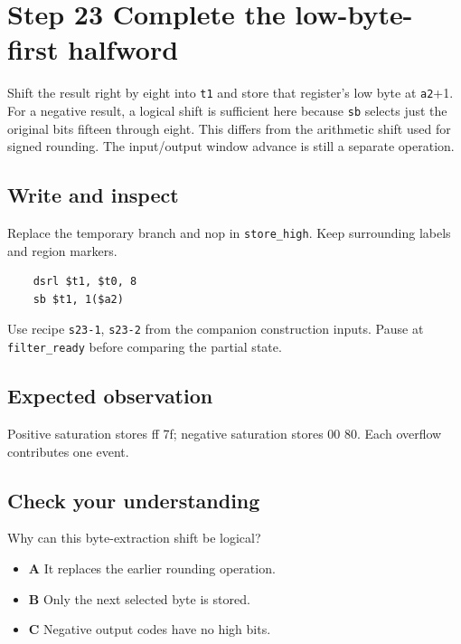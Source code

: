 \section{Step 23 Complete the low-byte-first halfword}\label{fir-s23}

Shift the result right by eight into \texttt{t1} and store that register’s low byte at \texttt{a2}+1. For a negative result, a logical shift is sufficient here because \texttt{sb} selects just the original bits fifteen through eight. This differs from the arithmetic shift used for signed rounding. The input/output window advance is still a separate operation.

\subsection{Write and inspect}
Replace the temporary branch and nop in \texttt{store\_high}. Keep surrounding labels and region markers.

\begin{verbatim}
    dsrl $t1, $t0, 8
    sb $t1, 1($a2)
\end{verbatim}
Use recipe \texttt{s23-1}, \texttt{s23-2} from the companion construction inputs. Pause at \texttt{filter\_ready} before comparing the partial state.

\subsection{Expected observation}
Positive saturation stores ff 7f; negative saturation stores 00 80. Each overflow contributes one event.

\subsection{Check your understanding}
Why can this byte-extraction shift be logical?

\begin{itemize}
\item \textbf{A} It replaces the earlier rounding operation.
\item \textbf{B} Only the next selected byte is stored.
\item \textbf{C} Negative output codes have no high bits.
\end{itemize}
